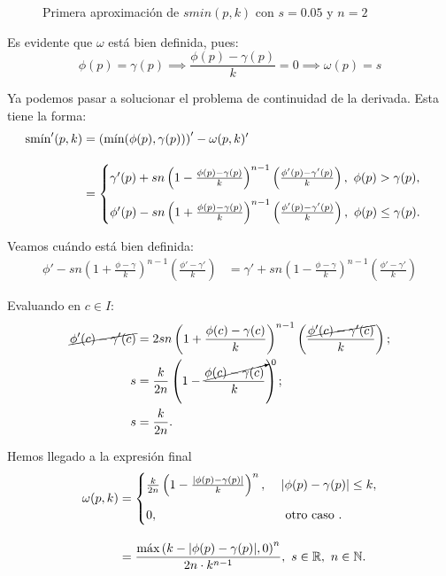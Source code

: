 \begin{figure}[!h]
\begin{minipage}[c]{0.49\linewidth}
        \caption{$k=0.1$}
     \end{minipage}
     \caption{Primera aproximación de $smin(p,k)$ con $s=0.05$ y $n=2$}
     \label{fig:smooth1}
\end{figure}

Es evidente que $\omega$ está bien definida, pues:
\begin{equation*}
    \phi(p)=\gamma(p) \implies \frac{\phi(p)-\gamma(p)}{k} = 0\implies \omega(p) = s
\end{equation*}

Ya podemos pasar a solucionar el problema de continuidad de la derivada. Esta tiene la forma:
\begin{align*}
    \smin'(p,k) &=  \left(\Min(\phi(p),\gamma(p))\right)' - \omega(p,k)'\\[10pt] &= \begin{cases}
        \gamma'(p) + sn\left(1-\frac{\phi(p)-\gamma(p)}{k}\right)^{n-1}\left(\frac{\phi'(p)-\gamma'(p)}{k}\right),\ \phi(p)>\gamma(p), \\[10pt] 
        \phi'(p) - sn\left(1+\frac{\phi(p)-\gamma(p)}{k}\right)^{n-1}\left(\frac{\phi'(p)-\gamma'(p)}{k}\right),\ \phi(p)\le \gamma(p).
    \end{cases}
\end{align*}

Veamos cuándo está bien definida:
\begin{align*}
    \phi' - sn\left(1+\frac{\phi-\gamma}{k}\right)^{n-1}\left(\frac{\phi'-\gamma'}{k}\right) &= \gamma' + sn\left(1-\frac{\phi-\gamma}{k}\right)^{n-1}\left(\frac{\phi'-\gamma'}{k}\right)
\end{align*}

Evaluando en $c\in I$:
\begin{align*}
    \cancel{\phi'(c) -  \gamma'(c)} &= 2sn\left(1+\frac{\phi(c)-\gamma(c)}{k}\right)^{n-1}\left(\frac{\cancel{\phi'(c)-\gamma'(c)}}{k}\right);\\
    s &= \frac{k}{2n}\left(1-\frac{\cancelto{0}{\phi(c)-\gamma(c)}}{k}\right);\\
    s &= \frac{k}{2n}.
\end{align*}
    
Hemos llegado a la expresión final
\begin{align*}
    \omega(p,k) &= \begin{cases}
        \frac{k}{2n}\left( 1-\frac{|\phi(p)-\gamma(p)|}{k} \right)^n,\ &|\phi(p)-\gamma(p)|\le k,\\[10pt]
        0,\ &\text{ otro caso }.
    \end{cases}\\[10pt] &= \frac{\Max\left( k - |\phi(p) - \gamma(p)|, 0\right)^n}{2n\cdot k^{n-1}}  ,\ s\in\R,\ n\in\N.
\end{align*}

